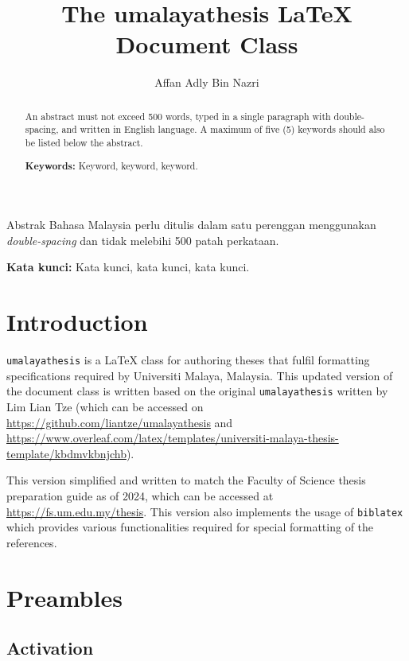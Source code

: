 \documentclass{umalayathesis}
\author{Affan Adly Bin Nazri}
\title{The umalayathesis \LaTeX{} Document Class}
\begin{document}
\frontmatter
\makecoverandtitlepage{\doctoralresearch}
\declarationpage

\begin{abstract}
An abstract must not exceed 500 words, typed in a single paragraph with double- spacing, and written in English language. A maximum of five (5) keywords should also be listed below the abstract.

\textbf{Keywords: } Keyword, keyword, keyword.
\end{abstract}

\begin{abstrak}
Abstrak Bahasa Malaysia perlu ditulis dalam satu perenggan menggunakan \textit{double-spacing} dan tidak melebihi 500 patah perkataan. 

\textbf{Kata kunci: } Kata kunci, kata kunci, kata kunci.
\end{abstrak}


{\clearpage
\tableofcontents\clearpage
\listoffigures\clearpage
\listoftables\clearpage
\listofacronyms\clearpage
\listofappendices\clearpage
}

\mainmatter

\chapter{Introduction}

\texttt{umalayathesis} is a \LaTeX{} class for authoring theses that fulfil formatting specifications required by Universiti Malaya, Malaysia. This updated version of the document class is written based on the original \texttt{umalayathesis} written by Lim Lian Tze (which can be accessed on \url{https://github.com/liantze/umalayathesis} and \url{https://www.overleaf.com/latex/templates/universiti-malaya-thesis-template/kbdmvkbnjchb}). 

This version simplified and written to match the Faculty of Science thesis preparation guide as of 2024, which can be accessed at \url{https://fs.um.edu.my/thesis}. This version also implements the usage of \texttt{biblatex} which provides various functionalities required for special formatting of the references.

\chapter{Preambles}

\section{Activation}
\end{document}
